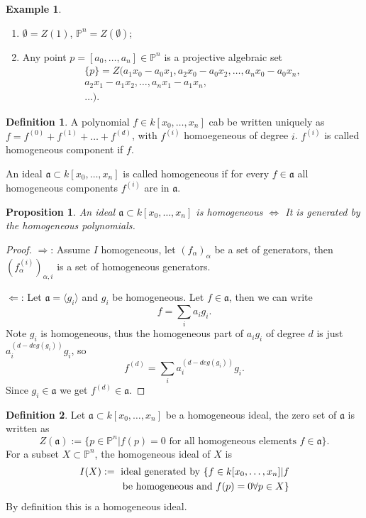 \documentclass{amsart}
\theoremstyle{plain}
\newtheorem{proposition}{Proposition}
\theoremstyle{definition}
\newtheorem{definition}{Definition}
\newtheorem{example}{Example}
\theoremstyle{remark}
\numberwithin{equation}{section}
\begin{document}
\begin{example}
	\begin{enumerate}
		\item $ \emptyset=Z(1) $, $ \mathbb{P}^n=Z(\emptyset) $;
		\item Any point $ p=[a_0,\dots,a_n]\in\mathbb{P}^n $ is a projective algebraic set
		\begin{align*}
		\{ p \}=Z(a_1x_0-a_0x_1,a_2x_0-a_0x_2,\dots,a_nx_0-a_0x_n,\\
		a_2x_1-a_1x_2,\dots,a_nx_1-a_1x_n,\\
		\dots).
		\end{align*}
	\end{enumerate}
\end{example}
\begin{definition}
	A polynomial $ f\in k[x_0,\dots,x_n] $ cab be written uniquely as $ f=f^{(0)}+f^{(1)}+\dots+ f^{(d)} $, with $ f^{(i)} $ homoegeneous of degree $ i $. $ f^{(i)} $ is called homogeneous component if $ f $.
	
	An ideal $ \mathfrak{a}\subset k[x_0,\dots,x_n] $ is called homogeneous if for every $ f\in \mathfrak{a} $ all homogeneous components $ f^{(i)} $ are in $ \mathfrak{a} $.
\end{definition}
\begin{proposition}
	An ideal $ \mathfrak{a}\subset k[x_0,\dots,x_n] $ is homogeneous $ \Leftrightarrow $ It is generated by the homogeneous polynomials.
\end{proposition}
\begin{proof}
	$ \Rightarrow $: Assume $ I $ homogeneous, let $ (f_\alpha)_\alpha $ be a set of generators, then $ (f^{(i)}_\alpha)_{\alpha,i} $ is a set of homogeneous generators.
	
	$ \Leftarrow $: Let $ \mathfrak{a} =\langle g_i\rangle $ and $ g_i $ be homogeneous. Let $ f\in \mathfrak{a}$, then we can write 
	\begin{equation}
	f=\sum\limits_{i}a_ig_i.
	\end{equation}
	Note $ g_i $ is homogeneous, thus the homogeneous part of $ a_ig_i $ of degree $ d $ is just $ a_i^{(d-deg(g_i))}g_i $, so
	\begin{equation}
	f^{(d)}=\sum\limits_{i} a_i^{(d-deg(g_i))}g_i.
	\end{equation}
	Since $ g_i\in \mathfrak{a} $ we get $ f^{(d)}\in \mathfrak{a} $.
\end{proof}
\begin{definition}
	Let $ \mathfrak{a}\subset k[x_0,\dots,x_n] $ be a homogeneous ideal, the zero set of $ \mathfrak{a} $ is written as
	\begin{equation}
	Z(\mathfrak{a}):=\{ p\in \mathbb{P}^n|f(p)=0 \text{ for all homogeneous elements } f\in \mathfrak{a} \}.\label{6}
	\end{equation} 
	For a subset $ X\subset \mathbb{P}^n $, the homogeneous ideal of $ X $ is 
	\begin{align}
	I(X):= \text{ ideal generated by } \{ f\in k[x_0,\dots,x_n]|f \label{7}\\
	\text{ be homogeneous and } f(p)=0 \forall p\in X \}\notag
	\end{align}
	By definition this is a homogeneous ideal.
\end{definition}
\end{document}
